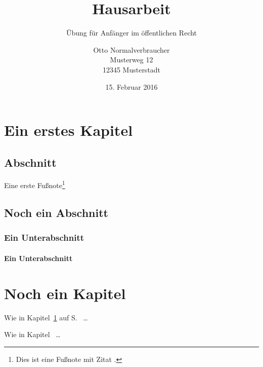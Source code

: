 \documentclass{hausarbeit-jura}
\begin{document}
\title{Hausarbeit}
\subtitle{Übung für Anfänger im öffentlichen Recht}
\author{Otto Normalverbraucher\\Musterweg 12\\12345 Musterstadt}
\date{15. Februar 2016}
\maketitle

\tableofcontents %

\chapter{Ein erstes Kapitel}\label{chap:ErstesKapitel}

\section{Abschnitt}
\blindtext[4]

Eine erste Fußnote\footnote{Dies ist eine Fußnote mit Zitat \cite[348, 349]{hau98}.}

\section{Noch ein Abschnitt}
\blindtext

\subsection{Ein Unterabschnitt}
\blindtext

\subsubsection{Ein Unterabschnitt}
\blindtext

\blindtext

\blindtext

\blindtext

\blindtext

\blindtext

\blindtext

\chapter{Noch ein Kapitel}
Wie in Kapitel~\ref{chap:ErstesKapitel} auf S.~\pageref{chap:ErstesKapitel} \ldots

Wie in Kapitel~ \ldots
\end{document}
